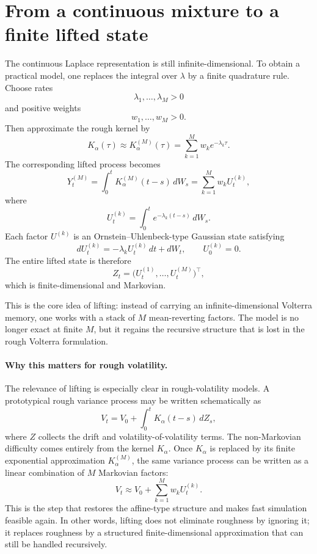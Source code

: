 \documentclass[a4paper,10pt,titlepage,oneside,openany]{book}
\theoremstyle{plain}
\theoremstyle{definition}
\theoremstyle{remark}
\newcommand{\1}{\mathbf{1}}
\begin{document}
\section{From a continuous mixture to a finite lifted state}

The continuous Laplace representation is still infinite-dimensional. To obtain a practical model, one replaces the integral over \(\lambda\) by a finite quadrature rule. Choose rates
\[
\lambda_1,\dots,\lambda_M>0
\]
and positive weights
\[
w_1,\dots,w_M>0.
\]
Then approximate the rough kernel by
\[
K_\alpha(\tau)\approx K_\alpha^{(M)}(\tau)
=
\sum_{k=1}^M w_k e^{-\lambda_k \tau}.
\]
The corresponding lifted process becomes
\[
Y_t^{(M)}
=
\int_0^t K_\alpha^{(M)}(t-s)\,dW_s
=
\sum_{k=1}^M w_k U_t^{(k)},
\]
where
\[
U_t^{(k)}
=
\int_0^t e^{-\lambda_k(t-s)}\,dW_s.
\]
Each factor \(U^{(k)}\) is an Ornstein--Uhlenbeck-type Gaussian state satisfying
\[
dU_t^{(k)}=-\lambda_k U_t^{(k)}\,dt + dW_t,
\qquad
U_0^{(k)}=0.
\]
The entire lifted state is therefore
\[
Z_t=\bigl(U_t^{(1)},\dots,U_t^{(M)}\bigr)^\top,
\]
which is finite-dimensional and Markovian.

This is the core idea of lifting: instead of carrying an infinite-dimensional Volterra memory, one works with a stack of \(M\) mean-reverting factors. The model is no longer exact at finite \(M\), but it regains the recursive structure that is lost in the rough Volterra formulation.

\paragraph{Why this matters for rough volatility.}

The relevance of lifting is especially clear in rough-volatility models. A prototypical rough variance process may be written schematically as
\[
V_t
=
V_0
+
\int_0^t K_\alpha(t-s)\,dZ_s,
\]
where \(Z\) collects the drift and volatility-of-volatility terms. The non-Markovian difficulty comes entirely from the kernel \(K_\alpha\). Once \(K_\alpha\) is replaced by its finite exponential approximation \(K_\alpha^{(M)}\), the same variance process can be written as a linear combination of \(M\) Markovian factors:
\[
V_t
\approx
V_0+\sum_{k=1}^M w_k U_t^{(k)}.
\]
This is the step that restores the affine-type structure and makes fast simulation feasible again. In other words, lifting does not eliminate roughness by ignoring it; it replaces roughness by a structured finite-dimensional approximation that can still be handled recursively.
\end{document}
